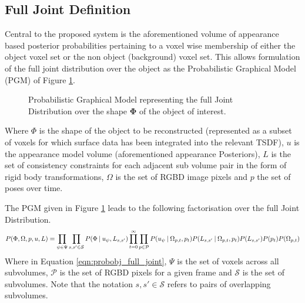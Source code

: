 \subsection{Full Joint Definition}
\label{subsec:probobj_full_joint}
Central to the proposed system is the aforementioned volume of appearance based
posterior probabilities pertaining to a voxel wise membership of either the
object voxel set or the non object (background) voxel set. This allows
formulation of the full joint distribution over the object as the Probabilistic
Graphical Model (PGM) of Figure \ref{fig:probobj_pgm1}.

\begin{figure}[ht]
  \label{fig:probobj_pgm1}
  \centering
  \caption[Probabilistic Object Reconstruction Formulation I]
  {Probabilistic Graphical Model representing the full Joint
    Distribution over the shape $\mathbf{\Phi}$ of the object of interest.}
\end{figure}

Where $\Phi$ is the shape of the object to be reconstructed (represented as a
subset of voxels for which surface data has been integrated into the relevant
TSDF), $u$ is the appearance model volume (aforementioned appearance Posteriors),
$L$ is the set of consistency constraints for each adjacent sub volume pair in
the form of rigid body transformations, $\Omega$ is the set of RGBD image pixels 
and $p$ the set of poses over time.

The PGM given in Figure \ref{fig:probobj_pgm1} leads to the following
factorisation over the full Joint Distribution.
\begin{equation}
  \label{eqn:probobj_full_joint}
  P(\Phi, \Omega, p, u, L) = 
  \prod_{\psi \in \Psi}\prod_{s, s' \in \mathcal{S}}
  P(\Phi \:\vert\: u_{\psi}, L_{s, s'}) 
  \prod_{t=0}^{\infty}\prod_{p \in \mathcal{P}}
  P(u_{\psi} \:\vert\: \Omega_{p, t}, p_{t})
  P(L_{s, s'} \:\vert\: \Omega_{p, t}, p_{t})
  P(L_{s, s'})P(p_{t})P(\Omega_{p, t})
\end{equation}
Where in Equation \ref{eqn:probobj_full_joint}, $\Psi$ is the set of voxels
across all subvolumes, $\mathcal{P}$ is the set of RGBD pixels for a given 
frame and $\mathcal{S}$ is the set of subvolumes. Note that the notation
$s, s' \in \mathcal{S}$ refers to pairs of overlapping subvolumes.


